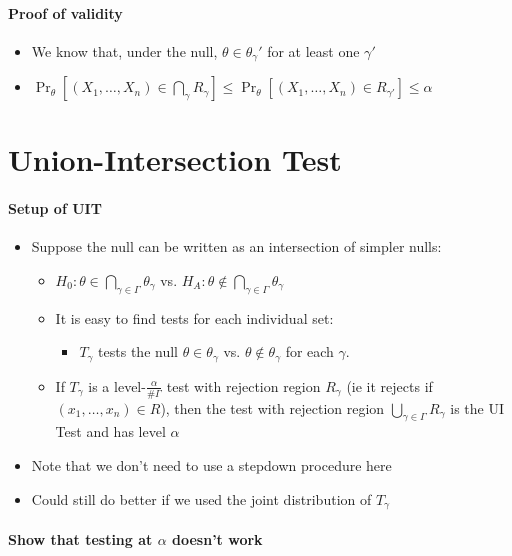\paragraph{Proof of validity}
\begin{itemize}
\item We know that, under the null, $\theta \in \theta_\gamma'$ for at least one $\gamma'$
\item $\Pr_\theta[(X_1,\dots,X_n) \in \bigcap_\gamma R_\gamma] \leq \Pr_\theta[(X_1,\dots, X_n) \in R_{\gamma'}] \leq \alpha$
\end{itemize}

\section{Union-Intersection Test}

\paragraph{Setup of UIT}
\begin{itemize}
\item Suppose the null can be written as an intersection of simpler
  nulls:
  \begin{itemize}
  \item $H_0: \theta \in \bigcap_{\gamma \in \Gamma} \theta_\gamma$ vs.  $H_A: \theta \notin \bigcap_{\gamma \in \Gamma} \theta_\gamma$
  \item It is easy to find tests for each individual set:
    \begin{itemize}
    \item $T_\gamma$ tests the null $\theta \in \theta_\gamma$ vs. $\theta \notin \theta_\gamma$ for each $\gamma$.
    \end{itemize}
  \item If $T_\gamma$ is a level-$\frac{\alpha}{\# \Gamma}$ test with rejection
    region $R_\gamma$ (ie it rejects if $(x_1,\dots,x_n) \in R$), then the test
    with rejection region $\bigcup_{\gamma \in \Gamma} R_\gamma$ is the UI Test and has level
    $\alpha$
  \end{itemize}
\item Note that we don't need to use a stepdown procedure here
\item Could still do better if we used the joint distribution of $T_\gamma$
\end{itemize}

\paragraph{Show that testing at $\alpha$ doesn't work}

